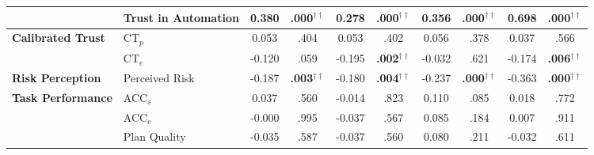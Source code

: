 \begin{table*}[ht]
\begin{small}
{\begin{tabular}{l | l| c c | c c | c c | c c}
    &Trust in Automation & 0.380 &\textbf{.000}$^{\dagger\dagger}$& 0.278 &\textbf{.000}$^{\dagger\dagger}$& 0.356 &\textbf{.000}$^{\dagger\dagger}$& 0.698 &\textbf{.000}$^{\dagger\dagger}$\\
	    \hline
    \multirow{2}{*}{\textbf{Calibrated Trust}}&CT$_p$ & 0.053 & .404& 0.053 & .402& 0.056 & .378& 0.037 & .566\\
    &CT$_e$ & -0.120 & .059& -0.195 &\textbf{.002}$^{\dagger\dagger}$& -0.032 & .621& -0.174 &\textbf{.006}$^{\dagger\dagger}$\\
    \hline
    \textbf{Risk Perception}& Perceived Risk & -0.187 &\textbf{.003}$^{\dagger\dagger}$& -0.180 &\textbf{.004}$^{\dagger\dagger}$& -0.237 &\textbf{.000}$^{\dagger\dagger}$& -0.363 &\textbf{.000}$^{\dagger\dagger}$\\
    \hline
    
    \multirow{3}{*}{\textbf{Task Performance}}&ACC$_s$ & 0.037 & .560& -0.014 & .823& 0.110 & .085& 0.018 & .772\\
    &ACC$_e$ & -0.000 & .995& -0.037 & .567& 0.085 & .184& 0.007 & .911\\
    &Plan Quality& -0.035 & .587& -0.037 & .560& 0.080 & .211& -0.032 & .611\\
    \hline
	\end{tabular}
        }
	\end{small}
\end{table*}

